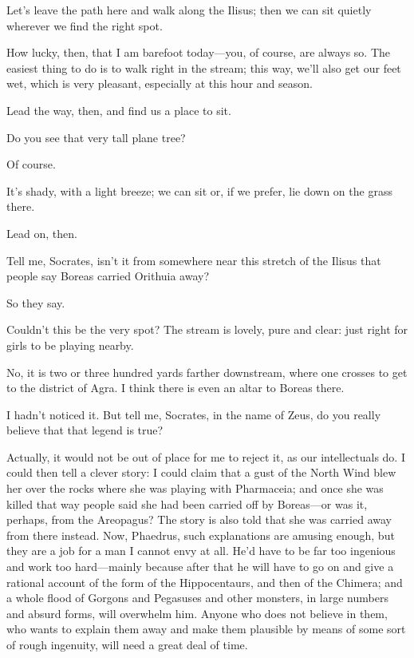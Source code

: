 \saysocrates Let's leave the path here and walk along the Ilisus; then we 
can sit quietly wherever we find the right spot.

\sayphaedrus How lucky, then, that I am barefoot today---you, of course,
are always so. The easiest thing to do is to walk right in the stream;
this way, we'll also get our feet wet, which is very pleasant,
especially at this hour and season.

\saysocrates Lead the way, then, and find us a place to sit.

\sayphaedrus Do you see that very tall plane tree?

\saysocrates Of course.

\sayphaedrus It's shady, with a light breeze; we can sit or, if we prefer,
lie down on the grass there.

\saysocrates Lead on, then.

\sayphaedrus Tell me, Socrates, isn't it from somewhere near this stretch
of the Ilisus that people say Boreas carried Orithuia
away?

\saysocrates So they say.

\sayphaedrus Couldn't this be the very spot? The stream is lovely, pure and
clear: just right for girls to be playing nearby.

\saysocrates No, it is two or three hundred yards farther downstream, 
where one crosses to get to the district of Agra. I think there
is even an altar to Boreas there.

\sayphaedrus I hadn't noticed it. But tell me, Socrates, in the name of
Zeus, do you really believe that that legend is true?

\saysocrates Actually, it would not be out of place for me to reject it, as
our intellectuals do. I could then tell a clever story: I could claim
that a gust of the North Wind blew her over the rocks where she was
playing with Pharmaceia; and once she was killed that way people said
she had been carried off by Boreas---or was it, perhaps, from the
Areopagus? The story is also told that she was carried away from
there instead. Now, Phaedrus, such explanations are amusing enough, but
they are a job for a man I cannot envy at all. He'd have to be far too
ingenious and work too hard---mainly because after that he will have to
go on and give a rational account of the form of the Hippocentaurs, and
then of the Chimera; and a whole flood of Gorgons and Pegasuses
and other monsters, in large numbers and absurd forms, will overwhelm
him. Anyone who does not believe in them, who wants to explain them away
and make them plausible by means of some sort of rough ingenuity, will
need a great deal of time.

